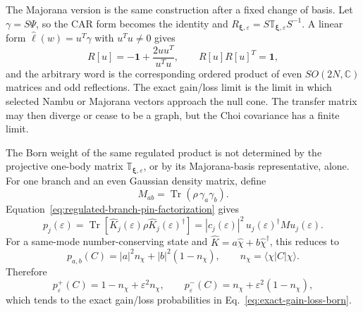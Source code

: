 \documentclass[aps,prb,onecolumn,nofootinbib,superscriptaddress]{revtex4-2}
\newcommand{\I}{\mathbf{1}}
\newcommand{\Tr}{\operatorname{Tr}}
\newcommand{\ket}[1]{\lvert #1\rangle}
\newcommand{\bra}[1]{\langle #1\rvert}
\newcommand{\bxi}{{\boldsymbol{\xi}}}
\theoremstyle{plain}
\theoremstyle{definition}
\begin{document}
The Majorana version is the same construction after a fixed change of basis.
Let \(\gamma=S\Psi\), so the CAR form becomes the identity and
\(R_{\bxi,\varepsilon}=S\mathbb T_{\bxi,\varepsilon}S^{-1}\).  A linear form
\(\hat\ell(w)=u^T\gamma\) with \(u^Tu\ne0\) gives
\begin{equation}
  R[u]=-
  \I+\frac{2uu^T}{u^Tu},
  \qquad
  R[u]R[u]^T=
  \I,
  \label{eq:majorana-reflection-arbitrary-u}
\end{equation}
and the arbitrary word is the corresponding ordered product of even
\(SO(2N,\mathbb C)\) matrices and odd reflections.  The exact gain/loss limit
is the limit in which selected Nambu or Majorana vectors approach the null
cone.  The transfer matrix may then diverge or cease to be a graph, but the
Choi covariance has a finite limit.
\fi

The Born weight of the same regulated product is not determined by the
projective one-body matrix \(\mathbb T_{\bxi,\varepsilon}\), or by its
Majorana-basis representative, alone.  For one branch and an even Gaussian
density matrix, define
\begin{equation}
  M_{ab}=\Tr(\rho\,\gamma_a\gamma_b).
  \label{eq:majorana-two-point-M}
\end{equation}
Equation~\eqref{eq:regulated-branch-pin-factorization} gives
\begin{equation}
  p_j(\varepsilon)
  =
  \Tr[\hat K_j(\varepsilon)\rho\hat K_j(\varepsilon)^\dagger]
  =
  |c_j(\varepsilon)|^2\,
  u_j(\varepsilon)^\dagger M u_j(\varepsilon).
  \label{eq:single-regulated-majorana-born}
\end{equation}
For a same-mode number-conserving state and
\(\hat K=a\hat\chi+b\hat\chi^\dagger\), this reduces to
\begin{equation}
  p_{a,b}(C)=|a|^2 n_\chi+|b|^2(1-n_\chi),
  \qquad
  n_\chi=\bra{\chi}C\ket{\chi} .
  \label{eq:single-regulated-u1-born}
\end{equation}
Therefore
\begin{equation}
  p^+_\varepsilon(C)=1-n_\chi+\varepsilon^2 n_\chi,
  \qquad
  p^-_\varepsilon(C)=n_\chi+\varepsilon^2(1-n_\chi),
  \label{eq:regulated-gain-loss-born-correct}
\end{equation}
which tends to the exact gain/loss probabilities in
Eq.~\eqref{eq:exact-gain-loss-born}.
\end{document}
